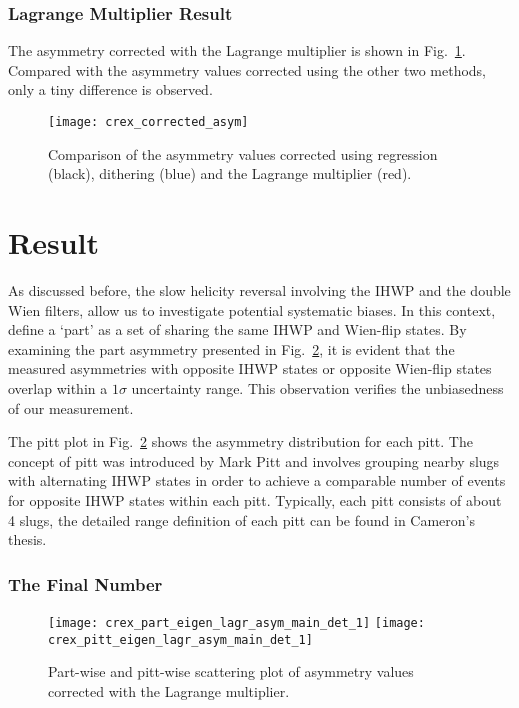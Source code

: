 \subsubsection{Lagrange Multiplier Result}
The asymmetry corrected with the Lagrange multiplier is shown in 
Fig.~\ref{fig:crex_corrected_asym}. Compared with the asymmetry values corrected
using the other two methods, only a tiny difference is observed.
\begin{figure}[!h]
    \centering
    \texttt{[image: crex\_corrected\_asym]}
    \caption{Comparison of the asymmetry values corrected using regression (black), 
    dithering (blue) and the Lagrange multiplier (red).}
    \label{fig:crex_corrected_asym}
\end{figure}

\section{Result}
As discussed before, the slow helicity reversal involving the IHWP and the 
double Wien filters, allow us to investigate potential systematic biases. 
In this context, define a `part' as a set of sharing the same IHWP and Wien-flip states.
By examining the part asymmetry presented in Fig.~\ref{fig:crex_part_pitt}, 
it is evident that the measured asymmetries with opposite IHWP states 
or opposite Wien-flip states overlap within a $1\sigma$ uncertainty range. 
This observation verifies the unbiasedness of our measurement.

The pitt plot in Fig.~\ref{fig:crex_part_pitt} shows the asymmetry distribution
for each pitt. The concept of pitt was introduced by Mark Pitt and involves grouping
nearby slugs with alternating IHWP states in order to achieve a comparable number of events for opposite IHWP states within each pitt.
Typically, each pitt consists of about 4 slugs, the detailed range definition
of each pitt can be found in Cameron's thesis.

\subsubsection{The Final Number}
\begin{figure}
    \centering
    \texttt{[image: crex\_part\_eigen\_lagr\_asym\_main\_det\_1]}
    \texttt{[image: crex\_pitt\_eigen\_lagr\_asym\_main\_det\_1]}
    \caption{Part-wise and pitt-wise scattering plot of asymmetry values
    corrected with the Lagrange multiplier.}
    \label{fig:crex_part_pitt}
\end{figure}

